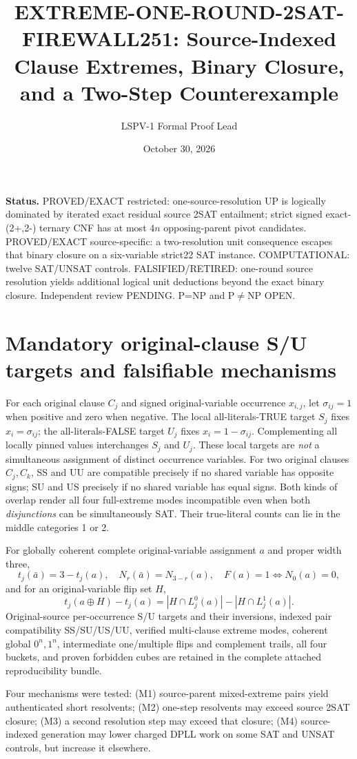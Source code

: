 \documentclass[10pt]{article}
\title{EXTREME-ONE-ROUND-2SAT-FIREWALL251: Source-Indexed Clause Extremes, Binary Closure, and a Two-Step Counterexample}
\author{LSPV-1 Formal Proof Lead}
\date{October 30, 2026}
\begin{document}
\maketitle
\noindent\textbf{Status.} PROVED/EXACT restricted: one-source-resolution UP is logically dominated by iterated exact residual source 2SAT entailment; strict signed exact-(2+,2-) ternary CNF has at most $4n$ opposing-parent pivot candidates. PROVED/EXACT source-specific: a two-resolution unit consequence escapes that binary closure on a six-variable strict22 SAT instance. COMPUTATIONAL: twelve SAT/UNSAT controls. FALSIFIED/RETIRED: one-round source resolution yields additional logical unit deductions beyond the exact binary closure. Independent review PENDING. P=NP and P$\ne$NP OPEN.

\section{Mandatory original-clause S/U targets and falsifiable mechanisms}
For each original clause $C_j$ and signed original-variable occurrence $x_{i,j}$, let $\sigma_{ij}=1$ when positive and zero when negative. The local all-literals-TRUE target $S_j$ fixes $x_i=\sigma_{ij}$; the all-literals-FALSE target $U_j$ fixes $x_i=1-\sigma_{ij}$. Complementing all locally pinned values interchanges $S_j$ and $U_j$. These local targets are \emph{not} a simultaneous assignment of distinct occurrence variables. For two original clauses $C_j,C_k$, SS and UU are compatible precisely if no shared variable has opposite signs; SU and US precisely if no shared variable has equal signs. Both kinds of overlap render all four full-extreme modes incompatible even when both \emph{disjunctions} can be simultaneously SAT. Their true-literal counts can lie in the middle categories 1 or 2.

For globally coherent complete original-variable assignment $a$ and proper width three,
\[
 t_j(\bar a)=3-t_j(a),\quad N_r(\bar a)=N_{3-r}(a),\quad
 F(a)=1\iff N_0(a)=0,
\]
and for an original-variable flip set $H$,
\[
 t_j(a\oplus H)-t_j(a)=|H\cap L_j^0(a)|-|H\cap L_j^1(a)|.
\]
Original-source per-occurrence S/U targets and their inversions, indexed pair compatibility SS/SU/US/UU, verified multi-clause extreme modes, coherent global $0^n,1^n$, intermediate one/multiple flips and complement trails, all four buckets, and proven forbidden cubes are retained in the complete attached reproducibility bundle.

Four mechanisms were tested: (M1) source-parent mixed-extreme pairs yield authenticated short resolvents; (M2) one-step resolvents may exceed source 2SAT closure; (M3) a second resolution step may exceed that closure; (M4) source-indexed generation may lower charged DPLL work on some SAT and UNSAT controls, but increase it elsewhere.
\end{document}
